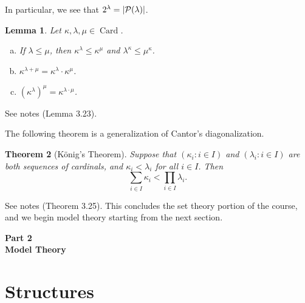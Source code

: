\documentclass[10pt]{article}
\makeatletter
\DeclareMathOperator{\Card}{Card}
\theoremstyle{newstyle}
\newtheorem{thm}{Theorem}[section]
\newtheorem{lemma}[thm]{Lemma}
\newenvironment{pf}[1][\proofname]{\par
  \pushQED{\qed}%
  \normalfont \topsep0\p@\relax
  \trivlist
  \item[\hskip\labelsep\scshape
  #1\@addpunct{.}]\ignorespaces
}{%
  \popQED\endtrivlist\@endpefalse
}
\makeatother
\begin{document}
In particular, we see that $2^\lambda = |{\cal P}(\lambda)|$. 

\begin{lemma} 
Let $\kappa, \lambda, \mu \in \Card$.
\begin{enumerate}[(a)]
    \item If $\lambda \leq \mu$, then $\kappa^\lambda \leq \kappa^\mu$ and $\lambda^\kappa \leq 
    \mu^\kappa$. 
    \item $\kappa^{\lambda+\mu} = \kappa^\lambda \cdot \kappa^\mu$.
    \item $(\kappa^\lambda)^\mu = \kappa^{\lambda \cdot \mu}$.
\end{enumerate} 
\end{lemma}
\begin{pf}
See notes (Lemma 3.23).
\end{pf}

The following theorem is a generalization of Cantor's diagonalization.

\begin{thm}[K\"onig's Theorem] 
Suppose that $(\kappa_i : i \in I)$ and $(\lambda_i : i \in I)$ are both sequences of cardinals, 
and $\kappa_i < \lambda_i$ for all $i \in I$. Then 
\[ \sum_{i\in I} \kappa_i < \prod_{i\in I} \lambda_i. \] 
\end{thm}
\begin{pf}
See notes (Theorem 3.25).
\end{pf}
This concludes the set theory portion of the course, and we begin model theory starting 
from the next section.

\newpage 
{}
\thispagestyle{empty}
\hspace{0pt}\vfill
\begin{center} 
\LARGE{{\bf Part 2}} \\\vspace{0.5cm}
\LARGE{\bf Model Theory}
\end{center}
\vfill\hspace{0pt}
\newpage 

\section{Structures}
\end{document}
